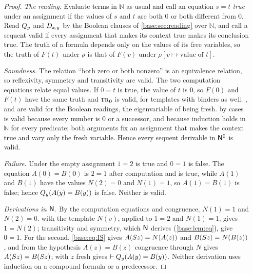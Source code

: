 \begin{proof}
\emph{The reading.} Evaluate terms in $\mathbb N$ as usual and call an
equation $s=t$ \emph{true} under an assignment if the values of $s$ and $t$
are both $0$ or both different from $0$. Read $Q_{y}$ and $D_{x,y}$ by the
Boolean clauses of \cref{base:sec:reading} over $\mathbb N$, and call a
sequent valid if every assignment that makes its context true makes its
conclusion true. The truth of a formula depends only on the values of its
free variables, so the truth of $F(t)$ under $\rho$ is that of $F(v)$ under
$\rho[v\mapsto\text{value of }t]$.

\emph{Soundness.} The relation ``both zero or both nonzero'' is an
equivalence relation, so reflexivity, symmetry and transitivity are valid.
The two computation equations relate equal values. If $0=t$ is true, the
value of $t$ is $0$, so $F(0)$ and $F(t)$ have the same truth and
$\rulename{Tr}_{0}$ is valid, for templates with binders as well.
,  and  are valid for the Boolean
readings, the eigenvariable of  being fresh.  by
cases is valid because every number is $0$ or a successor, and
 because induction holds in $\mathbb N$ for every predicate;
both arguments fix an assignment that makes the context true and vary only
the fresh variable. Hence every sequent derivable in $\mathsf{N}^{0}$ is valid.

\emph{Failure.} Under the empty assignment $1=2$ is true and $0=1$ is false.
The equation $A(0)=B(0)$ is $2=1$ after computation and is true, while
$A(1)$ and $B(1)$ have the values $N(2)=0$ and $N(1)=1$, so $A(1)=B(1)$ is
false; hence $Q_{y}(A(y)=B(y))$ is false. Neither is valid.

\emph{Derivations in $\mathsf{N}$.} By the computation equations and congruence,
$N(1)=1$ and $N(2)=0$.  with the template $N(v)$, applied to
$1=2$ and $N(1)=1$, gives $1=N(2)$; transitivity and symmetry, which
$\mathsf{N}$ derives (\cref{base:lem:eq}), give $0=1$. For the second,
\eqref{base:eq:IS} gives $A(S z)=N(A(z))$ and $B(S z)=N(B(z))$, and
from the hypothesis $A(z)=B(z)$ congruence through $N$ gives
$A(S z)=B(S z)$;  with $z$ fresh gives
$\vdash Q_{y}(A(y)=B(y))$. Neither derivation uses induction on a compound
formula or a predecessor.
\end{proof}

